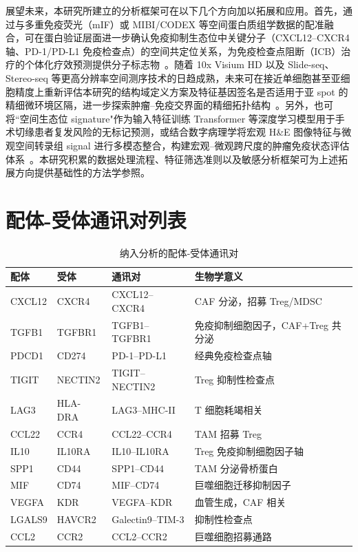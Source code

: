 \documentclass[12pt, a4paper]{ctexart}
\begin{document}
展望未来，本研究所建立的分析框架可在以下几个方向加以拓展和应用。首先，通过与多重免疫荧光（mIF）或 MIBI/CODEX 等空间蛋白质组学数据的配准融合，可在蛋白验证层面进一步确认免疫抑制生态位中关键分子（CXCL12--CXCR4 轴、PD-1/PD-L1 免疫检查点）的空间共定位关系，为免疫检查点阻断（ICB）治疗的个体化疗效预测提供分子标志物~\citep{keren2018structured,zhu2021spark}。随着 10x Visium HD 以及 Slide-seq、Stereo-seq 等更高分辨率空间测序技术的日趋成熟，未来可在接近单细胞甚至亚细胞精度上重新评估本研究的结构域定义方案及特征基因签名是否适用于亚 spot 的精细微环境区隔，进一步探索肿瘤--免疫交界面的精细拓扑结构~\citep{moses2022museum,chen2022spatia}。另外，也可将``空间生态位 signature"作为输入特征训练 Transformer 等深度学习模型用于手术切缘患者复发风险的无标记预测，或结合数字病理学将宏观 H\&E 图像特征与微观空间转录组 signal 进行多模态整合，构建宏观--微观跨尺度的肿瘤免疫状态评估体系~\citep{chen2016liver,shmatko2022artific}。本研究积累的数据处理流程、特征筛选准则以及敏感分析框架可为上述拓展方向提供基础性的方法学参照。


\newpage
\appendix
\renewcommand{\thesection}{\Alph{section}}

\section{配体-受体通讯对列表}
\label{app:lr_table}

\begin{table}[H]
\centering
\caption{纳入分析的配体-受体通讯对}
\label{tab:lr_pairs}
\begin{tabularx}{\textwidth}{lllX}
\toprule
\textbf{配体} & \textbf{受体} & \textbf{通讯对} & \textbf{生物学意义} \\
\midrule
CXCL12 & CXCR4   & CXCL12--CXCR4  & CAF 分泌，招募 Treg/MDSC \\
TGFB1  & TGFBR1  & TGFB1--TGFBR1  & 免疫抑制细胞因子，CAF+Treg 共分泌 \\
PDCD1  & CD274   & PD-1--PD-L1    & 经典免疫检查点轴 \\
TIGIT  & NECTIN2 & TIGIT--NECTIN2 & Treg 抑制性检查点 \\
LAG3   & HLA-DRA & LAG3--MHC-II   & T 细胞耗竭相关 \\
CCL22  & CCR4    & CCL22--CCR4    & TAM 招募 Treg \\
IL10   & IL10RA  & IL10--IL10RA   & Treg 免疫抑制细胞因子轴 \\
SPP1   & CD44    & SPP1--CD44     & TAM 分泌骨桥蛋白 \\
MIF    & CD74    & MIF--CD74      & 巨噬细胞迁移抑制因子 \\
VEGFA  & KDR     & VEGFA--KDR     & 血管生成，CAF 相关 \\
LGALS9 & HAVCR2  & Galectin9--TIM-3 & 抑制性检查点 \\
CCL2   & CCR2    & CCL2--CCR2     & 巨噬细胞招募通路 \\
\bottomrule
\end{tabularx}
\end{table}
\end{document}

